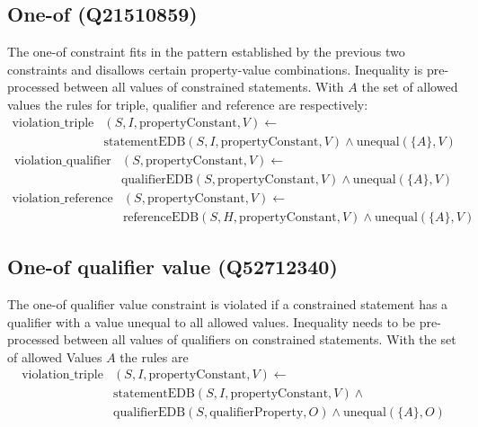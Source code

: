 \documentclass[hyperref,bachelorofscience,fleqn]{cgvpub}
\begin{document}
\subsection{One-of (Q21510859)}
The one-of constraint fits in the pattern established by the previous two constraints and disallows certain property-value combinations. Inequality is pre-processed between all values of constrained statements. With \(A\) the set of allowed values the rules for triple, qualifier and reference are respectively:
\begin{equation*}
\begin{split}
\text{violation\_triple}&(S, I, \text{propertyConstant}, V) \leftarrow \\
&\text{statementEDB}(S, I, \text{propertyConstant}, V) \wedge \text{unequal}(\{A\}, V)
\end{split}
\end{equation*}
\begin{equation*}
\begin{split}
\text{violation\_qualifier}&(S, \text{propertyConstant}, V) \leftarrow \\
&\text{qualifierEDB}(S, \text{propertyConstant}, V) \wedge \text{unequal}(\{A\}, V)
\end{split}
\end{equation*}
\begin{equation*}
\begin{split}
\text{violation\_reference}&(S, \text{propertyConstant}, V) \leftarrow \\
&\text{referenceEDB}(S, H, \text{propertyConstant}, V) \wedge \text{unequal}(\{A\}, V)
\end{split}
\end{equation*}

\subsection{One-of qualifier value (Q52712340)}
The one-of qualifier value constraint is violated if a constrained statement has a qualifier with a value unequal to all allowed values. Inequality needs to be pre-processed between all values of qualifiers on constrained statements. With the set of allowed Values \(A\) the rules are
\begin{equation*}
\begin{split}
\text{violation\_triple}&(S, I, \text{propertyConstant}, V) \leftarrow \\
&\text{statementEDB}(S, I, \text{propertyConstant}, V) \wedge{} \\
&\text{qualifierEDB}(S, \text{qualifierProperty}, O) \wedge \text{unequal}(\{A\}, O)
\end{split}
\end{equation*}
\end{document}
